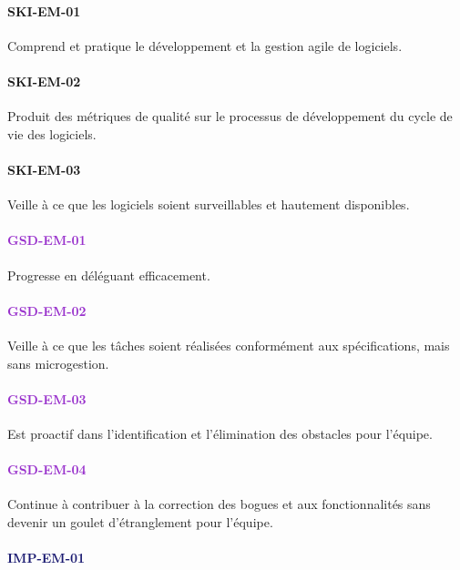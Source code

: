 \documentclass[a4paper, french, openany, 12pt]{book}
\newcommand\dex[1]{\textcolor{BrickRed}{\textbf{\uppercase{ski-{#1}}}}}
\newcommand\str[1]{\textcolor{DarkOrchid}{\textbf{\uppercase{gsd-{#1}}}}}
\newcommand\wis[1]{\textcolor{MidnightBlue}{\textbf{\uppercase{imp-{#1}}}}}
\begin{document}
\begin{multicols}{2}

  \paragraph*{\dex{em-01}}

  Comprend et pratique le développement et la gestion agile de logiciels.

  \paragraph*{\dex{em-02}}

  Produit des métriques de qualité sur le processus de développement du cycle de vie des logiciels.

  \paragraph*{\dex{em-03}}

  Veille à ce que les logiciels soient surveillables et hautement disponibles.

  \paragraph*{\str{em-01}}

  Progresse en déléguant efficacement.

  \paragraph*{\str{em-02}}

  Veille à ce que les tâches soient réalisées conformément aux spécifications, mais sans microgestion.

  \paragraph*{\str{em-03}}

  Est proactif dans l'identification et l'élimination des obstacles pour l'équipe.

  \paragraph*{\str{em-04}}

  Continue à contribuer à la correction des bogues et aux fonctionnalités sans devenir un goulet d'étranglement pour
  l'équipe.

  \paragraph*{\wis{em-01}}


\end{multicols}
\end{document}
